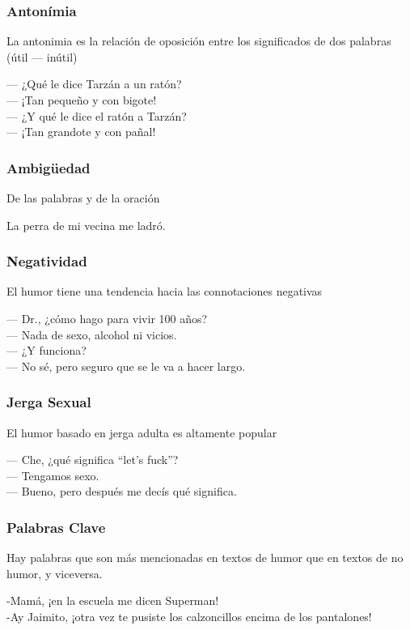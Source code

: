 \begin{frame}
\frametitle{Antonímia}
    La antonimia es la relación de oposición entre los significados de dos palabras (útil — inútil)
    \begin{example}
        — ¿Qué le dice Tarzán a un ratón?\\
        — ¡Tan pequeño y con bigote!\\
        — ¿Y qué le dice el ratón a Tarzán?\\
        — ¡Tan grandote y con pañal!\\
    \end{example}
\end{frame}

\begin{frame}
\frametitle{Ambigüedad}
    De las palabras y de la oración
    \begin{example}
        La perra de mi vecina me ladró.
    \end{example}
\end{frame}

\begin{frame}
\frametitle{Negatividad}
    El humor tiene una tendencia hacia las connotaciones negativas
    \begin{example}
        — Dr., ¿cómo hago para vivir 100 años?\\
        — Nada de sexo, alcohol ni vicios.\\
        — ¿Y funciona?\\
        — No sé, pero seguro que se le va a hacer largo.
    \end{example}
\end{frame}

\begin{frame}
\frametitle{Jerga Sexual}
    El humor basado en jerga adulta es altamente popular
    \begin{example}
        — Che, ¿qué significa “let’s fuck”?\\
        — Tengamos sexo.\\
        — Bueno, pero después me decís qué significa.
    \end{example}
\end{frame}

\begin{frame}
\frametitle{Palabras Clave}
    Hay palabras que son más mencionadas en textos de humor que en textos de no humor, y viceversa.
    \begin{example}
        -Mamá, ¡en la escuela me dicen Superman!\\
        -Ay Jaimito, ¡otra vez te pusiste los calzoncillos encima de los pantalones!
    \end{example}
\end{frame}

